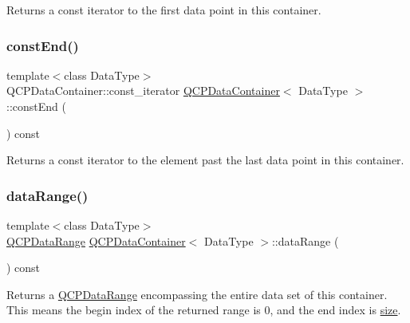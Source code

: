 Returns a const iterator to the first data point in this container. \mbox{\label{class_q_c_p_data_container_aa7f7cf239b85b1a28de3d675cc5b3da1}} 
\subsubsection{\texorpdfstring{const\+End()}{constEnd()}}
{\footnotesize\ttfamily template$<$class Data\+Type$>$ \\
Q\+C\+P\+Data\+Container\+::const\+\_\+iterator \hyperlink{class_q_c_p_data_container}{Q\+C\+P\+Data\+Container}$<$ Data\+Type $>$\+::const\+End (\begin{DoxyParamCaption}{ }\end{DoxyParamCaption}) const\hspace{0.3cm}{\ttfamily [inline]}}

Returns a const iterator to the element past the last data point in this container. \mbox{\label{class_q_c_p_data_container_aece90eeb2ba8d3c46d3d94023630fbc7}} 
\subsubsection{\texorpdfstring{data\+Range()}{dataRange()}}
{\footnotesize\ttfamily template$<$class Data\+Type$>$ \\
\hyperlink{class_q_c_p_data_range}{Q\+C\+P\+Data\+Range} \hyperlink{class_q_c_p_data_container}{Q\+C\+P\+Data\+Container}$<$ Data\+Type $>$\+::data\+Range (\begin{DoxyParamCaption}{ }\end{DoxyParamCaption}) const\hspace{0.3cm}{\ttfamily [inline]}}

Returns a \hyperlink{class_q_c_p_data_range}{Q\+C\+P\+Data\+Range} encompassing the entire data set of this container. This means the begin index of the returned range is 0, and the end index is \hyperlink{class_q_c_p_data_container_a8e9b262c739672e13472d0d45b720258}{size}. \mbox{\label{class_q_c_p_data_container_a2ad8a5399072d99a242d3a6d2d7e278a}} 
